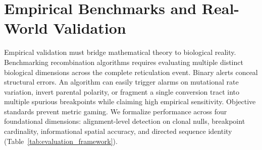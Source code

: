 \section{Empirical Benchmarks and Real-World Validation}
\label{sec:results}

Empirical validation must bridge mathematical theory to biological reality.
Benchmarking recombination algorithms requires evaluating multiple distinct biological dimensions across the complete reticulation event.
Binary alerts conceal structural errors.
An algorithm can easily trigger alarms on mutational rate variation, invert parental polarity, or fragment a single conversion tract into multiple spurious breakpoints while claiming high empirical sensitivity.
Objective standards prevent metric gaming.
We formalize performance across four foundational dimensions: alignment-level detection on clonal nulls, breakpoint cardinality, informational spatial accuracy, and directed sequence identity (Table~\ref{tab:evaluation_framework}).

